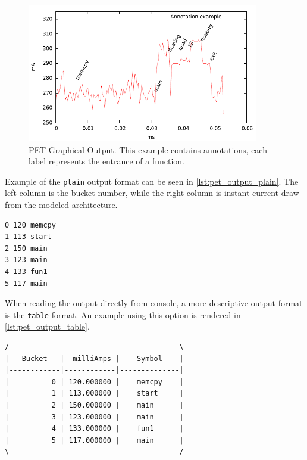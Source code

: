 \begin{figure}[htb]
    \centering
    \includegraphics[width=0.9\textwidth]{figs/annot.pdf}
    \caption{PET Graphical Output. This example contains annotations, each label
    represents the entrance of a function.}
    \label{fig:annot}
\end{figure}

Example of the \texttt{plain} output format can be seen in
\autoref{lst:pet_output_plain}. The left column is the bucket number, while the
right column is instant current draw from the modeled architecture.

\begin{lstlisting}[numbers=none,float=hbt,label={lst:pet_output_plain},caption={PET plain output with function annotations.}]
0 120 memcpy
1 113 start
2 150 main
3 123 main
4 133 fun1
5 117 main
\end{lstlisting}

When reading the output directly from console, a more descriptive output format
is the \texttt{table} format. An example using this option is rendered in
\autoref{lst:pet_output_table}.

\begin{lstlisting}[numbers=none,float=hbt,label={lst:pet_output_table},caption={PET table output with function annotations.}]
/----------------------------------------\
|   Bucket   |  milliAmps |    Symbol    |
|------------|------------|--------------|
|          0 | 120.000000 |    memcpy    |
|          1 | 113.000000 |    start     |
|          2 | 150.000000 |    main      |
|          3 | 123.000000 |    main      |
|          4 | 133.000000 |    fun1      |
|          5 | 117.000000 |    main      |
\----------------------------------------/
\end{lstlisting}


